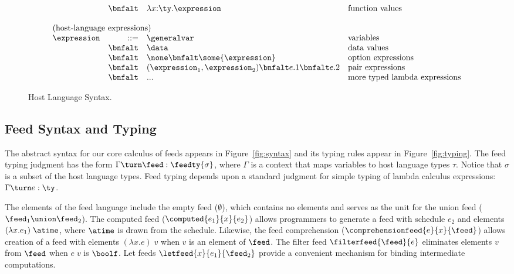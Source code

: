 \begin{figure}[t]
\[\begin{array}{lrll}
& \bnfalt & \lambda x{:}\ty.\expression & \mbox{function values} \\
\\
\multicolumn{4}{l}{\mbox{(host-language expressions)}}\\ 
\expression & ::= & \generalvar & \mbox{variables} \\
 & \bnfalt & \data & \mbox{data values} \\
 & \bnfalt & \none \bnfalt 
              \some{\expression} & \mbox{option expressions}\\
 & \bnfalt & (\expression_1,\expression_2) \bnfalt e.1 \bnfalt e.2 
    & \mbox{pair expressions} \\
 & \bnfalt & ... & \mbox{more typed lambda expressions} \\
\end{array}
\]
\caption{Host Language Syntax.}
\label{fig:host-language}
\end{figure}


\subsection{Feed Syntax and Typing}

The abstract syntax for our core calculus of feeds appears in
Figure~\ref{fig:syntax} and its typing rules appear in 
Figure~\ref{fig:typing}.  The feed typing judgment has the form
$\Gamma \turn \feed : \feedty{\sigma}$, where $\Gamma$ is a context that maps
variables to host language types $\tau$.  Notice that $\sigma$ is a subset of the
host language types.  Feed typing depends upon a standard judgment for
simple typing of lambda calculus expressions:  $\Gamma \turn e : \ty$.

The elements of the feed language include
the empty feed ($\emptyset$), which contains no elements and serves as
the unit for the union feed ($\feed_1 \union \feed_2$).  The
computed feed ($\computed{e_1}{x}{e_2}$) allows programmers to
generate a feed with schedule $e_2$ and elements $(\lambda x.e_1)\; \atime$,
where $\atime$ is drawn from the schedule. Likewise, the feed 
comprehension ($\comprehensionfeed{e}{x}{\feed}$) allows creation of a 
feed with elements $(\lambda x.e)\; v$ when $v$ is an element of $\feed$.
The filter feed
$\filterfeed{\feed}{e}$ eliminates elements $v$ from $\feed$ when
$e\; v$ is $\boolf$.  Let feeds $\letfeed{x}{e_1}{\feed_2}$
provide a convenient mechanism for binding intermediate computations.

